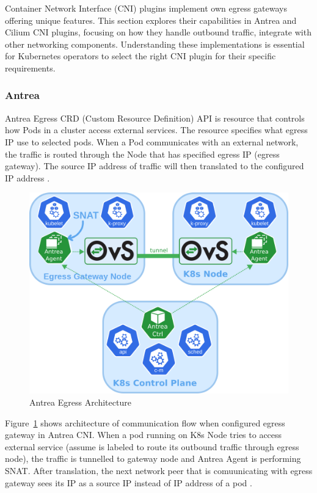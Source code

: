 Container Network Interface (CNI) plugins implement own egress gateways offering unique features. This section explores their capabilities in Antrea and Cilium CNI plugins, focusing on how they handle outbound traffic, integrate with other networking components. Understanding these implementations is essential for Kubernetes operators to select the right CNI plugin for their specific requirements.


\subsubsection{Antrea}
\label{subsection:antreaEgress}

Antrea Egress CRD (Custom Resource Definition) API is resource that controls how Pods in a cluster access external services. The resource specifies what egress IP use to selected pods. When a Pod communicates with an external network, the traffic is routed through the Node that has specified egress IP (egress gateway). The source IP address of traffic will then translated to the configured IP address \cite{AntreaEgressArch}.

\begin{figure}[tbh]
    \centering
    \includegraphics[width=0.6\columnwidth]{images/antrea_overview.png}
    \caption{Antrea Egress Architecture \cite{AntreaEgressArch}}
    \label{fig:antreaEgressArch}
\end{figure}


Figure~\ref{fig:antreaEgressArch} shows architecture of communication flow when configured egress gateway in Antrea CNI. When a pod running on K8s Node tries to access external service (assume is labeled to route its outbound traffic through egress node), the traffic is tunnelled to gateway node and Antrea Agent is performing SNAT. After translation, the next network peer that is comuunicating with egress gateway sees its IP as a source IP instead of IP address of a pod \cite{AntreaEgressArch} \cite{AntreaSNAT}. 

